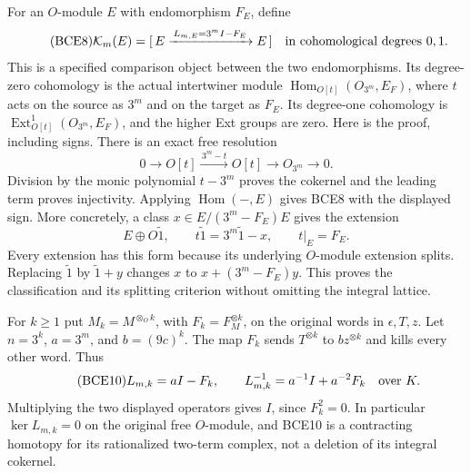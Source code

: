 For an \(O\)-module \(E\) with endomorphism \(F_E\), define
\begin{equation}\tag{BCE8}
\mathcal K_m(E)=
[\,E\xrightarrow{\,L_{m,E}=3^mI-F_E\,}E\,]
\quad\hbox{in cohomological degrees }0,1 .
\end{equation}
This is a specified comparison object between the two endomorphisms.
Its degree-zero cohomology is the actual intertwiner module
\(\operatorname{Hom}_{O[t]}(O_{3^m},E_F)\), where \(t\) acts on the
source as \(3^m\) and on the target as \(F_E\). Its degree-one
cohomology is \(\operatorname{Ext}^1_{O[t]}(O_{3^m},E_F)\), and
the higher Ext groups are zero. Here is the proof, including signs.
There is an exact free resolution
\begin{equation}\tag{BCE9}
0\longrightarrow O[t]\xrightarrow{\,3^m-t\,}O[t]
\longrightarrow O_{3^m}\longrightarrow0 .
\end{equation}
Division by the monic polynomial \(t-3^m\) proves the cokernel and
the leading term proves injectivity. Applying \(\operatorname{Hom}(-,E)\)
gives BCE8 with the displayed sign.
More concretely, a class \(x\in E/(3^m-F_E)E\) gives the extension
\[
E\oplus O\widetilde 1,\qquad
t\widetilde1=3^m\widetilde1-x,\qquad t|_E=F_E .
\]
Every extension has this form because its underlying \(O\)-module
extension splits. Replacing \(\widetilde1\) by
\(\widetilde1+y\) changes \(x\) to \(x+(3^m-F_E)y\).
This proves the classification and its splitting criterion without
omitting the integral lattice.

For \(k\ge1\) put \(M_k=M^{\otimes_O k}\), with
\(F_k=F_M^{\otimes k}\), on the original words in \(\epsilon,T,z\).
Let \(n=3^k\), \(a=3^m\), and \(b=(9c)^k\).
The map \(F_k\) sends \(T^{\otimes k}\) to \(b z^{\otimes k}\)
and kills every other word. Thus
\begin{equation}\tag{BCE10}
L_{m,k}=aI-F_k,\qquad
L_{m,k}^{-1}=a^{-1}I+a^{-2}F_k\quad\hbox{over }K .
\end{equation}
Multiplying the two displayed operators gives \(I\), since
\(F_k^2=0\). In particular \(\ker L_{m,k}=0\) on the original
free \(O\)-module, and BCE10 is a contracting homotopy for its
rationalized two-term complex, not a deletion of its integral
cokernel.


